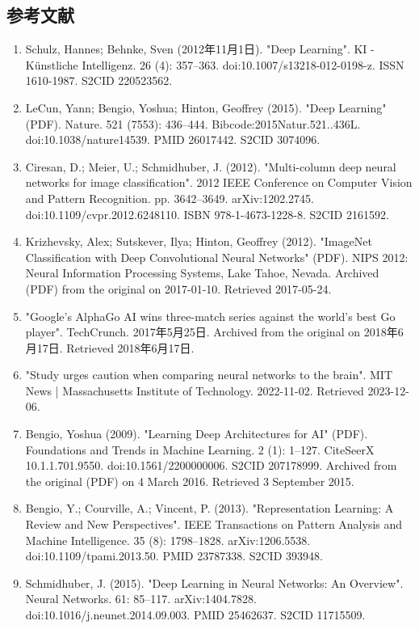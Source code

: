 \subsection{参考文献}
\begin{enumerate}
\item Schulz, Hannes; Behnke, Sven (2012年11月1日). "Deep Learning". KI - Künstliche Intelligenz. 26 (4): 357–363. doi:10.1007/s13218-012-0198-z. ISSN 1610-1987. S2CID 220523562.  
\item LeCun, Yann; Bengio, Yoshua; Hinton, Geoffrey (2015). "Deep Learning" (PDF). Nature. 521 (7553): 436–444. Bibcode:2015Natur.521..436L. doi:10.1038/nature14539. PMID 26017442. S2CID 3074096.  
\item Ciresan, D.; Meier, U.; Schmidhuber, J. (2012). "Multi-column deep neural networks for image classification". 2012 IEEE Conference on Computer Vision and Pattern Recognition. pp. 3642–3649. arXiv:1202.2745. doi:10.1109/cvpr.2012.6248110. ISBN 978-1-4673-1228-8. S2CID 2161592.  
\item Krizhevsky, Alex; Sutskever, Ilya; Hinton, Geoffrey (2012). "ImageNet Classification with Deep Convolutional Neural Networks" (PDF). NIPS 2012: Neural Information Processing Systems, Lake Tahoe, Nevada. Archived (PDF) from the original on 2017-01-10. Retrieved 2017-05-24.  
\item "Google's AlphaGo AI wins three-match series against the world's best Go player". TechCrunch. 2017年5月25日. Archived from the original on 2018年6月17日. Retrieved 2018年6月17日.  
\item "Study urges caution when comparing neural networks to the brain". MIT News | Massachusetts Institute of Technology. 2022-11-02. Retrieved 2023-12-06.  
\item Bengio, Yoshua (2009). "Learning Deep Architectures for AI" (PDF). Foundations and Trends in Machine Learning. 2 (1): 1–127. CiteSeerX 10.1.1.701.9550. doi:10.1561/2200000006. S2CID 207178999. Archived from the original (PDF) on 4 March 2016. Retrieved 3 September 2015.  
\item Bengio, Y.; Courville, A.; Vincent, P. (2013). "Representation Learning: A Review and New Perspectives". IEEE Transactions on Pattern Analysis and Machine Intelligence. 35 (8): 1798–1828. arXiv:1206.5538. doi:10.1109/tpami.2013.50. PMID 23787338. S2CID 393948.  
\item Schmidhuber, J. (2015). "Deep Learning in Neural Networks: An Overview". Neural Networks. 61: 85–117. arXiv:1404.7828. doi:10.1016/j.neunet.2014.09.003. PMID 25462637. S2CID 11715509.  

\end{enumerate}
